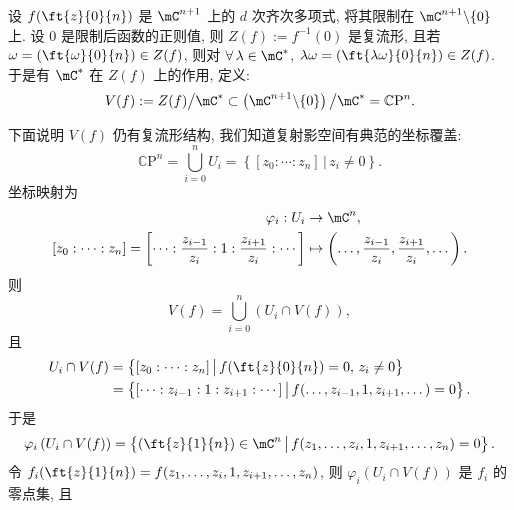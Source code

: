         \begin{example}[齐次多项式零点定义的射影空间的子集]
            设 $f(\ft{z}{0}{n})$ 是 $\mC^{n+1}$ 上的 $d$ 次齐次多项式, 将其限制在 $\mC^{n+1}\backslash\{0\}$ 上.
            设 $0$ 是限制后函数的正则值, 则 $Z(f):=f^{-1}(0)$ 是复流形, 且若 $\omega = (\ft{\omega}{0}{n})\in Z(f)$, 
            则对 $\forall\,\lambda\in\mC^{*}$, $\lambda\omega = (\ft{\lambda\omega}{0}{n})\in Z(f)$.
             于是有 $\mC^*$ 在 $Z(f)$ 上的作用, 定义:
            \begin{equation*}
                V(f):=Z(f)\big/ \mC^*\subset\left(\mC^{n+1}\backslash\{0\}\right)\big/\mC^* = \mathbb{C}\mathrm{P}^n.
            \end{equation*}
            
            下面说明 $V(f)$ 仍有复流形结构, 我们知道复射影空间有典范的坐标覆盖: 
            \begin{equation*}
                \mathbb{C}\mathrm{P}^n = \bigcup_{i=0}^{n}U_i = \left\{[z_0:\cdots:z_n]\,\big|\,z_i\neq0\right\}.
            \end{equation*}
            坐标映射为
            \begin{align*}
                \varphi_i:U_i&\rightarrow\mC^n, \\
                [z_0:\cdots:z_n] = \left[\cdots:\frac{z_{i-1}}{z_i}:1:\frac{z_{i+1}}{z_i}:\cdots\right]&\mapsto\left(\dots,\frac{z_{i-1}}{z_i},\frac{z_{i+1}}{z_i},\dots\right).
            \end{align*}
            则
            \begin{equation*}
                V(f) = \bigcup_{i=0}^{n}\left(U_i\cap V(f)\right),
            \end{equation*}
            且 
            \begin{align*}
                U_i\cap V(f) &= \left\{[z_0:\cdots:z_n]\,\big|\,f(\ft{z}{0}{n}) = 0,\,z_i\neq0\right\} \\
                & = \left\{[\cdots:z_{i-1}:1:z_{i+1}:\cdots]\,\big|\,f(\dots,z_{i-1},1,z_{i+1},\dots) = 0\right\}.
            \end{align*}
            于是
            \begin{align*}
                \varphi_i\left(U_i\cap V(f)\right) = \left\{(\ft{z}{1}{n})\in\mC^n\,\big|\,f(z_1,\dots,z_i,1,z_{i+1},\dots,z_n)=0\right\}. \\
            \end{align*}
            令 $f_i(\ft{z}{1}{n}) = f(z_1,\dots,z_i,1,z_{i+1},\dots,z_n)$, 则 $\varphi_i\left(U_i\cap V(f)\right)$ 是 $f_i$ 的零点集, 且

\end{example}
